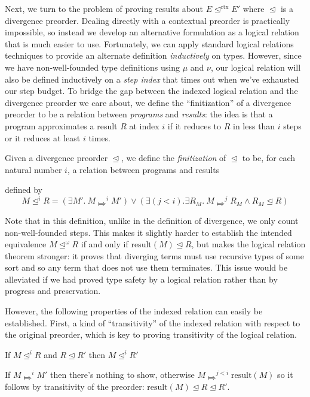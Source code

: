 \documentclass[acmsmall,nonacm]{acmart}
\newif\iflong
\renewcommand{\u}{\underline}
\newcommand{\pipe}{\,\,|\,\,}
\newcommand{\apreorder}{\trianglelefteq}
\newcommand{\ctxize}[1]{\mathrel{{#1}^{\text{ctx}}}}
\newcommand{\ix}[2]{\mathrel{#1^{#2}}}
\newcommand{\bigstepsin}[1]{\mathrel{\Mapsto^{#1}}}
\newcommand{\result}{\text{result}}
\begin{document}
{\begin{longonly}
Next, we turn to the problem of proving results about $E
\ctxize\apreorder E'$ where $\apreorder$ is a divergence preorder.
%
Dealing directly with a contextual preorder is practically impossible,
so instead we develop an alternative formulation as a logical relation
that is much easier to use.
%
Fortunately, we can apply standard logical relations techniques to
provide an alternate definition \emph{inductively} on types.
%
However, since we have non-well-founded type definitions using
$\mu$ and $\nu$, our logical relation will also be defined inductively on a
\emph{step index} that times out when we've exhausted our step budget.
%
To bridge the gap between the indexed logical relation and the
divergence preorder we care about, we define the ``finitization'' of a
divergence preorder to be a relation between \emph{programs} and
\emph{results}: the idea is that a program approximates a result $R$
at index $i$ if it reduces to $R$ in less than $i$ steps or it reduces
at least $i$ times.
\end{longonly}

\begin{definition}
  Given a divergence preorder $\apreorder$, we define the
  \emph{finitization} of $\apreorder$ to be, for each natural number
  $i$, a relation between programs and results
\iflong
  \[ {\ix\apreorder i} \subseteq \{ M \pipe \cdot\vdash M : \u F 2\} \times \text{Results} \]
\fi
  defined by
  \[
  M \ix \apreorder i R = (\exists M'.~ M \bigstepsin{i} M') \vee (\exists (j< i). \exists R_M.~ M \bigstepsin{j} R_M \wedge R_M \apreorder R)
  \]
\end{definition}

\begin{longonly}
Note that in this definition, unlike in the definition of divergence,
we only count non-well-founded steps.
%
This makes it slightly harder to establish the intended equivalence $M
\ix \apreorder \omega R$ if and only if $\result(M) \apreorder R$, but
makes the logical relation theorem stronger: it proves that diverging
terms must use recursive types of some sort and so any term that does
not use them terminates.
%
This issue would be alleviated if we had proved type safety by a
logical relation rather than by progress and preservation.

However, the following properties of the indexed relation can easily
be established.
%
First, a kind of ``transitivity'' of the indexed relation with respect
to the original preorder, which is key to proving transitivity of the
logical relation.
\begin{lemma}
\label{lem:module}
  If $M \ix\apreorder i R$ and $R \apreorder R'$ then $M \ix\apreorder i R'$
\end{lemma}
\begin{longproof}
  If $M \bigstepsin{i} M'$ then there's nothing to show, otherwise
  $M \bigstepsin{j< i} \result(M)$ so it follows by transitivity of the
  preorder: $\result(M) \apreorder R \apreorder R'$.
\end{longproof}


\end{longonly}}
\end{document}
